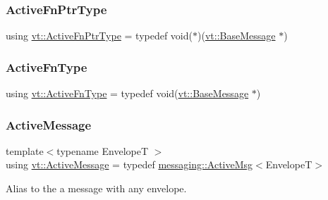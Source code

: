 \mbox{\label{namespacevt_a70e19bd64d031e65083c2125b2c65426}} 
\subsubsection{\texorpdfstring{Active\+Fn\+Ptr\+Type}{ActiveFnPtrType}}
{\footnotesize\ttfamily using \hyperlink{namespacevt_a70e19bd64d031e65083c2125b2c65426}{vt\+::\+Active\+Fn\+Ptr\+Type} = typedef void($\ast$)(\hyperlink{namespacevt_ac34f95a5e2b8109b55bfba52b074443d}{vt\+::\+Base\+Message} $\ast$)}

\mbox{\label{namespacevt_a546925d221208866b866b2edf8f24d04}} 
\subsubsection{\texorpdfstring{Active\+Fn\+Type}{ActiveFnType}}
{\footnotesize\ttfamily using \hyperlink{namespacevt_a546925d221208866b866b2edf8f24d04}{vt\+::\+Active\+Fn\+Type} = typedef void(\hyperlink{namespacevt_ac34f95a5e2b8109b55bfba52b074443d}{vt\+::\+Base\+Message} $\ast$)}

\mbox{\label{namespacevt_a00eb67bd138395b6a4f744fab3fa0678}} 
\subsubsection{\texorpdfstring{Active\+Message}{ActiveMessage}}
{\footnotesize\ttfamily template$<$typename EnvelopeT $>$ \\
using \hyperlink{namespacevt_a00eb67bd138395b6a4f744fab3fa0678}{vt\+::\+Active\+Message} = typedef \hyperlink{structvt_1_1messaging_1_1_active_msg}{messaging\+::\+Active\+Msg}$<$EnvelopeT$>$}



Alias to the a message with any envelope. 

\mbox{\label{namespacevt_ae4fbf97da623bfcd09ee8379de756257}} 
